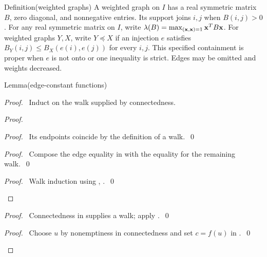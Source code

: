 \begin{namedresult}{Definition}{(weighted graphs)}\label{def:rem-weighted}
A weighted graph on $I$ has a real symmetric matrix $B$, zero diagonal,
and nonnegative entries. Its support joins $i,j$ when $B(i,j)>0$.
For any real symmetric matrix on $I$, write
$\lambda(B)=\max_{({\mathbf x},{\mathbf x})=1}{\mathbf x}^TB{\mathbf x}$.
For weighted graphs $Y,X$, write $Y\preccurlyeq X$ if an injection $e$
satisfies $B_Y(i,j)\leq B_X(e(i),e(j))$ for every $i,j$.
This specified containment is proper when $e$ is not onto or one inequality
is strict. Edges may be omitted and weights decreased.
\end{namedresult}

\begin{namedresult}{Lemma}{(edge-constant functions)}\label{lem:rem-edge-constant}
\end{namedresult}
\begin{proof}
\pfsketch\ Induct on the walk supplied by connectedness.
\begin{proof}
\begin{proof}\pf\ Its endpoints coincide by the definition of a walk.~\qed\end{proof}
\begin{proof}\pf\ Compose the edge equality in  with
the equality for the remaining walk.~\qed\end{proof}
\qedstep
\begin{proof}\pf\ Walk induction using ,
.~\qed\end{proof}
\end{proof}
\begin{proof}\pf\ Connectedness in  supplies a walk;
apply .~\qed\end{proof}
\qedstep
\begin{proof}\pf\ Choose $u$ by nonemptiness in connectedness and set
$c=f(u)$ in .~\qed\end{proof}
\end{proof}

